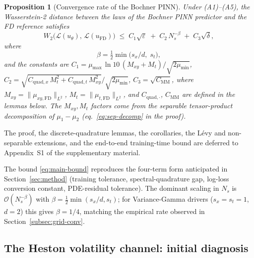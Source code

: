 \documentclass[review,12pt]{elsarticle}
\newtheorem{proposition}{Proposition}
\begin{document}
\begin{proposition}[Convergence rate of the Bochner PINN]
\label{thm:main}
Under (A1)--(A5), the Wasserstein-2 distance between the laws of the
Bochner PINN predictor and the FD reference satisfies
\begin{equation}
W_2\bigl(\mathcal L(u_\theta),\,\mathcal L(u_{\mathrm{FD}})\bigr)
\;\le\; C_1\sqrt{\varepsilon}
\;+\; C_2\,N_s^{-\beta}
\;+\; C_3\sqrt{\delta},
\label{eq:main-bound}
\end{equation}
where
\begin{equation}
\beta = \tfrac{1}{2}\min\!\bigl(s_x / d,\; s_t\bigr),
\end{equation}
and the constants are
\(C_1 = \mu_{\max}\,\ln 10\,(M_{xy}+M_t) / \sqrt{2\mu_{\min}}\),
\(C_2 = \sqrt{C_{\mathrm{quad},x}\,M_t^2 + C_{\mathrm{quad},t}\,M_{xy}^2}
/ \sqrt{2\mu_{\min}}\),
\(C_3 = \sqrt{C_{\mathrm{MM}}}\),
where \(M_{xy} = \|\mu_{xy,\mathrm{FD}}\|_{L^2}\),
\(M_t = \|\mu_{t,\mathrm{FD}}\|_{L^2}\), and
\(C_{\mathrm{quad},\cdot}\), \(C_{\mathrm{MM}}\) are defined in
the lemmas below. The \(M_{xy},M_t\) factors come from the separable
tensor-product decomposition of \(\mu_1 - \mu_2\) (eq.\
\eqref{eq:sep-decomp} in the proof).
\end{proposition}

The proof, the discrete-quadrature lemmas, the corollaries, the
L\'evy and non-separable extensions, and the end-to-end training-time
bound are deferred to Appendix~S1 of the supplementary material.

The bound \eqref{eq:main-bound} reproduces the four-term form
anticipated in Section~\ref{sec:method} (training tolerance,
spectral-quadrature gap, log-loss conversion constant, PDE-residual
tolerance). The dominant scaling in $N_s$ is
$\mathcal{O}(N_s^{-\beta})$ with $\beta = \tfrac{1}{2}\min(s_x/d, s_t)$;
for Variance-Gamma drivers ($s_x = s_t = 1$, $d = 2$) this gives
$\beta = 1/4$, matching the empirical rate observed in
Section~\ref{subsec:grid-conv}.

\subsection{The Heston volatility channel: initial diagnosis}
\label{subsec:cir-analysis}
\end{document}
